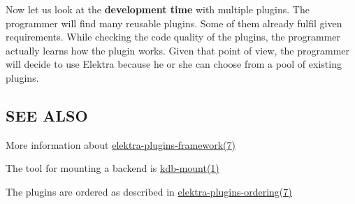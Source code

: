 Now let us look at the {\bfseries development time} with multiple plugins. The programmer will find many reusable plugins. Some of them already fulfil given requirements. While checking the code quality of the plugins, the programmer actually learns how the plugin works. Given that point of view, the programmer will decide to use Elektra because he or she can choose from a pool of existing plugins.

\subsection*{S\+E\+E A\+L\+S\+O}


\begin{DoxyItemize}
\item More information about \hyperlink{md_doc_help_elektra-plugins-framework_doc_help_elektra-plugins-framework_md}{elektra-\/plugins-\/framework(7)}
\item The tool for mounting a backend is \hyperlink{md_doc_help_kdb-mount_doc_help_kdb-mount_md}{kdb-\/mount(1)}
\item The plugins are ordered as described in \hyperlink{md_doc_help_elektra-plugins-ordering_doc_help_elektra-plugins-ordering_md}{elektra-\/plugins-\/ordering(7)} 
\end{DoxyItemize}